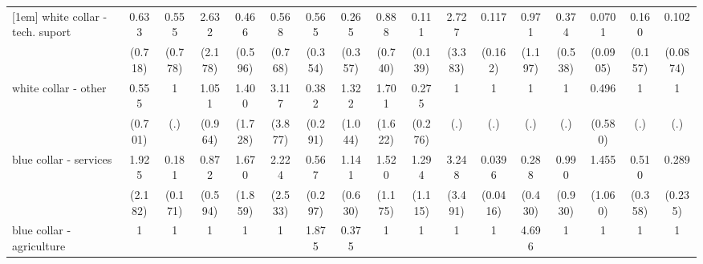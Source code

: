 {\begin{tabular}{l*{16}{c}}
[1em]
white collar - tech. suport&       0.633         &       0.555         &       2.632         &       0.466         &       0.568         &       0.565         &       0.265         &       0.888         &       0.111         &       2.727         &       0.117         &       0.971         &       0.374         &      0.0701\sym{*}  &       0.160         &       0.102\sym{**} \\
                    &     (0.718)         &     (0.778)         &     (2.178)         &     (0.596)         &     (0.768)         &     (0.354)         &     (0.357)         &     (0.740)         &     (0.139)         &     (3.383)         &     (0.162)         &     (1.197)         &     (0.538)         &    (0.0905)         &     (0.157)         &    (0.0874)         \\
[1em]
white collar - other&       0.555         &           1         &       1.051         &       1.400         &       3.117         &       0.382         &       1.322         &       1.701         &       0.275         &           1         &           1         &           1         &           1         &       0.496         &           1         &           1         \\
                    &     (0.701)         &         (.)         &     (0.964)         &     (1.728)         &     (3.877)         &     (0.291)         &     (1.044)         &     (1.622)         &     (0.276)         &         (.)         &         (.)         &         (.)         &         (.)         &     (0.580)         &         (.)         &         (.)         \\
[1em]
blue collar - services&       1.925         &       0.181         &       0.872         &       1.670         &       2.224         &       0.567         &       1.141         &       1.520         &       1.294         &       3.248         &      0.0396\sym{**} &       0.288         &       0.990         &       1.455         &       0.510         &       0.289         \\
                    &     (2.182)         &     (0.171)         &     (0.594)         &     (1.859)         &     (2.533)         &     (0.297)         &     (0.630)         &     (1.175)         &     (1.115)         &     (3.491)         &    (0.0416)         &     (0.430)         &     (0.930)         &     (1.060)         &     (0.358)         &     (0.235)         \\
[1em]
blue collar - agriculture&           1         &           1         &           1         &           1         &           1         &       1.875         &       0.375         &           1         &           1         &           1         &           1         &       4.696         &           1         &           1         &           1         &           1         \\

\end{tabular}}
